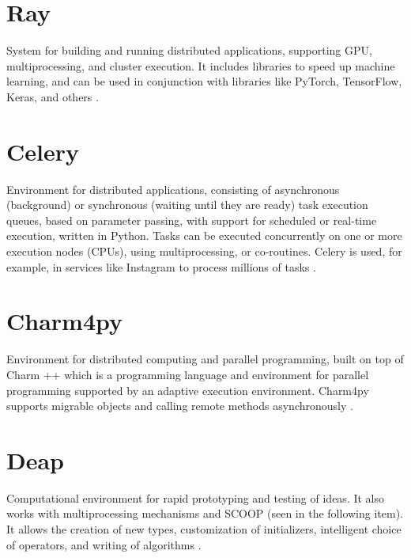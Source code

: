 \section{Ray}

System for building and running distributed applications, supporting GPU, multiprocessing, and cluster execution. It includes libraries to speed up machine learning, and can be used in conjunction with libraries like PyTorch, TensorFlow, Keras, and others \cite{Moritz2018}.




\section{Celery}

Environment for distributed applications, consisting of asynchronous (background) or synchronous (waiting until they are ready) task execution queues, based on parameter passing, with support for scheduled or real-time execution, written in Python. Tasks can be executed concurrently on one or more execution nodes (CPUs), using multiprocessing, or co-routines. Celery is used, for example, in services like Instagram to process millions of tasks \cite{Mcleod2015}.




\section{Charm4py}

Environment for distributed computing and parallel programming, built on top of Charm ++ which is a programming language and environment for parallel programming supported by an adaptive execution environment. Charm4py supports migrable objects and calling remote methods asynchronously \cite{Choi2021}.




\section{Deap}

Computational environment for rapid prototyping and testing of ideas. It also works with multiprocessing mechanisms and SCOOP (seen in the following item). It allows the creation of new types, customization of initializers, intelligent choice of operators, and writing of algorithms \cite{Rainville2012}.




